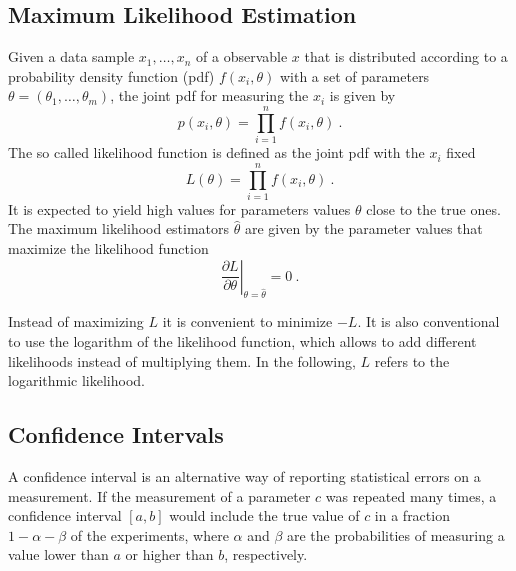 \subsection{Maximum Likelihood Estimation}
\label{subsec:maxlikeest}
Given a data sample $x_1,\dots,x_n$ of a observable $x$ that is distributed according to a probability density function (pdf) $f(x_i,\theta)$ with a set of parameters $\theta=(\theta_1,\dots,\theta_m)$, the joint pdf for measuring the $x_i$ is given by \cite{cowan}
\begin{equation}
p(x_i,\theta) = \prod_{i=1}^n f(x_i,\theta) ~.
\end{equation}
The so called likelihood function is defined as the joint pdf with the $x_i$ fixed
\begin{equation}
L(\theta) = \prod_{i=1}^n f(x_i,\theta) ~.
\end{equation}
It is expected to yield high values for parameters values $\theta$ close to the true ones. The maximum likelihood estimators $\hat{\theta}$ are given by the parameter values that maximize the likelihood function
\begin{equation}
\left. \frac{\partial L}{\partial \theta} \right| _{\theta=\hat{\theta}} = 0 ~.
\label{eq:limits:1stderivlikelihood}
\end{equation}

Instead of maximizing $L$ it is convenient to minimize $-L$. It is also conventional to use the logarithm of the likelihood function, which allows to add different likelihoods instead of multiplying them. In the following, $L$ refers to the logarithmic likelihood.

\subsection{Confidence Intervals}
A confidence interval is an alternative way of reporting statistical errors on a measurement. If the measurement of a parameter $c$ was repeated many times, a confidence interval $[a,b]$ would include the true value of $c$ in a fraction $1-\alpha-\beta$ of the experiments, where $\alpha$ and $\beta$ are the probabilities of measuring a value lower than $a$ or higher than $b$, respectively.\\

